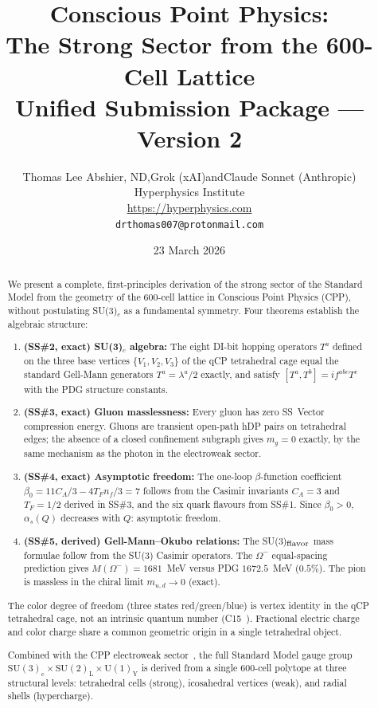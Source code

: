 \documentclass[11pt,a4paper]{article}
\title{\textbf{Conscious Point Physics:\\
The Strong Sector from the 600-Cell Lattice}\\[6pt]
{\large Unified Submission Package --- Version 2}}
\author{Thomas Lee Abshier, ND,\quad Grok (xAI)\quad and\quad Claude Sonnet (Anthropic)\\
Hyperphysics Institute\\
\url{https://hyperphysics.com}\\
\texttt{drthomas007@protonmail.com}}
\date{23 March 2026}
\newcommand{\as}{\alpha_s}
\begin{document}
\maketitle

\begin{abstract}
We present a complete, first-principles derivation of the strong
sector of the Standard Model from the geometry of the 600-cell
lattice in Conscious Point Physics (CPP), without postulating
SU(3)$_c$ as a fundamental symmetry.  Four theorems establish the
algebraic structure:

\begin{enumerate}
\item \textbf{(SS\#2, exact) SU(3)$_c$ algebra:}
The eight DI-bit hopping operators $T^a$ defined on the three base
vertices $\{V_1, V_2, V_3\}$ of the qCP tetrahedral cage equal
the standard Gell-Mann generators $T^a = \lambda^a/2$ exactly, and
satisfy $[T^a, T^b] = if^{abc}T^c$ with the PDG structure constants.

\item \textbf{(SS\#3, exact) Gluon masslessness:}
Every gluon has zero SS~Vector compression energy.  Gluons are
transient open-path hDP pairs on tetrahedral edges; the absence
of a closed confinement subgraph gives $m_g = 0$ exactly, by the
same mechanism as the photon in the electroweak sector.

\item \textbf{(SS\#4, exact) Asymptotic freedom:}
The one-loop $\beta$-function coefficient
$\beta_0 = 11C_A/3 - 4T_F n_f/3 = 7$
follows from the Casimir invariants $C_A = 3$ and $T_F = 1/2$
derived in SS\#3, and the six quark flavours from SS\#1.  Since
$\beta_0 > 0$, $\as(Q)$ decreases with $Q$: asymptotic freedom.

\item \textbf{(SS\#5, derived) Gell-Mann--Okubo relations:}
The SU(3)$_{\rm flavor}$ mass formulae follow from the SU(3)
Casimir operators.  The $\Omega^-$ equal-spacing prediction gives
$M(\Omega^-) = 1681$~MeV versus PDG $1672.5$~MeV ($0.5\%$).
The pion is massless in the chiral limit $m_{u,d} \to 0$ (exact).
\end{enumerate}

The color degree of freedom (three states red/green/blue) is vertex
identity in the qCP tetrahedral cage, not an intrinsic quantum number
(C15~\citep{c15}).  Fractional electric charge and color charge share
a common geometric origin in a single tetrahedral object.

Combined with the CPP electroweak sector~\citep{cpp_ew_unified}, the
full Standard Model gauge group
$\mathrm{SU(3)_c \times SU(2)_L \times U(1)_Y}$
is derived from a single 600-cell polytope at three structural levels:
tetrahedral cells (strong), icosahedral vertices (weak), and radial
shells (hypercharge).
\end{abstract}
\end{document}
